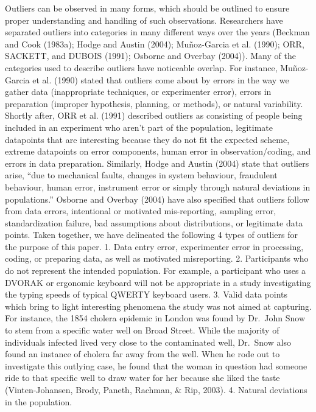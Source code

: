 \documentclass[english,man]{apa6}
\theoremstyle{definition}
\theoremstyle{definition}
\theoremstyle{definition}
\theoremstyle{remark}
\begin{document}
Outliers can be observed in many forms, which should be outlined to
ensure proper understanding and handling of such observations.
Researchers have separated outliers into categories in many different
ways over the years (Beckman and Cook (1983a); Hodge and Austin (2004);
Muñoz-Garcia et al. (1990); ORR, SACKETT, and DUBOIS (1991); Osborne and
Overbay (2004)). Many of the categories used to describe outliers have
noticeable overlap. For instance, Muñoz-Garcia et al. (1990) stated that
outliers come about by errors in the way we gather data (inappropriate
techniques, or experimenter error), errors in preparation (improper
hypothesis, planning, or methods), or natural variability. Shortly
after, ORR et al. (1991) described outliers as consisting of people
being included in an experiment who aren't part of the population,
legitimate datapoints that are interesting because they do not fit the
expected scheme, extreme datapoints on error components, human error in
observation/coding, and errors in data preparation. Similarly, Hodge and
Austin (2004) state that outliers arise, \enquote{due to mechanical
faults, changes in system behaviour, fraudulent behaviour, human error,
instrument error or simply through natural deviations in populations.}
Osborne and Overbay (2004) have also specified that outliers follow from
data errors, intentional or motivated mis-reporting, sampling error,
standardization failure, bad assumptions about distributions, or
legitimate data points. Taken together, we have delineated the following
4 types of outliers for the purpose of this paper. 1. Data entry error,
experimenter error in processing, coding, or preparing data, as well as
motivated misreporting. 2. Participants who do not represent the
intended population. For example, a participant who uses a DVORAK or
ergonomic keyboard will not be appropriate in a study investigating the
typing speeds of typical QWERTY keyboard users. 3. Valid data points
which bring to light interesting phenomena the study was not aimed at
capturing. For instance, the 1854 cholera epidemic in London was found
by Dr.~John Snow to stem from a specific water well on Broad Street.
While the majority of individuals infected lived very close to the
contaminated well, Dr.~Snow also found an instance of cholera far away
from the well. When he rode out to investigate this outlying case, he
found that the woman in question had someone ride to that specific well
to draw water for her because she liked the taste (Vinten-Johansen,
Brody, Paneth, Rachman, \& Rip, 2003). 4. Natural deviations in the
population.
\end{document}
